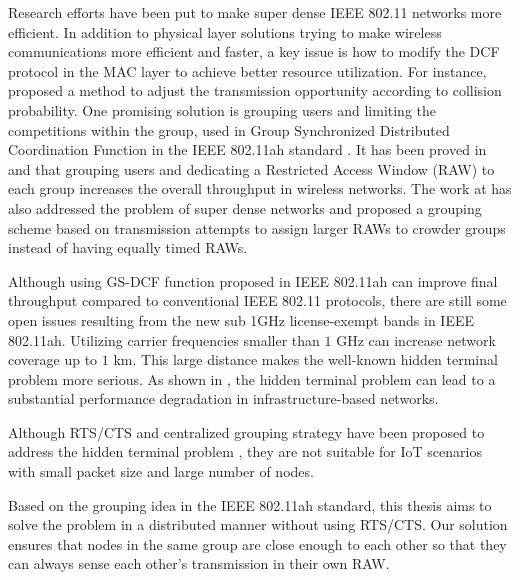 Research efforts have been put to make super dense IEEE 802.11 networks more efficient. In addition to physical layer solutions trying to make wireless communications more efficient and faster, a key issue is how to modify the DCF protocol in the MAC layer to achieve better resource utilization. For instance, \cite{zhong2014dcf} proposed a method to adjust the transmission opportunity according to collision probability. One promising solution is grouping users and limiting the competitions within the group, used in Group Synchronized Distributed Coordination Function in the IEEE 802.11ah standard \cite{Draft80211ah}. It has been proved in \cite{zheng2014performance} and \cite{raeesi2014performance} that grouping users and dedicating a Restricted Access Window (RAW) to each group increases the overall throughput in wireless networks. \iffalse CHECK THIS \fi The work at \cite{kim2015optimal} has also addressed the problem of super dense networks and proposed a grouping scheme based on transmission attempts to assign larger RAWs to crowder groups instead of having equally timed RAWs. 

Although using GS-DCF function proposed in IEEE 802.11ah can improve final throughput compared to conventional IEEE 802.11 protocols, there are still some open issues resulting from the new sub 1GHz license-exempt bands in IEEE 802.11ah. Utilizing carrier frequencies smaller than $1$ GHz can increase network coverage up to $1$ km. This large distance makes the well-known hidden terminal problem more serious. As shown in \iffalse CHECK THIS \fi \cite{wu2006wsn02,tsertou2008revisiting,khurana1999performance}, the hidden terminal problem can lead to a substantial performance degradation in infrastructure-based networks. 

Although RTS/CTS and centralized grouping strategy have been proposed to address the hidden terminal problem \cite{yoonregrouping,tseng2014effective}, they are not suitable for IoT scenarios with small packet size and large number of nodes.


Based on the grouping idea in the IEEE 802.11ah standard, this thesis aims to solve the problem in a distributed manner without using RTS/CTS. Our solution ensures that nodes in the same group are close enough to each other so that they can always sense each other's transmission in their own RAW.

